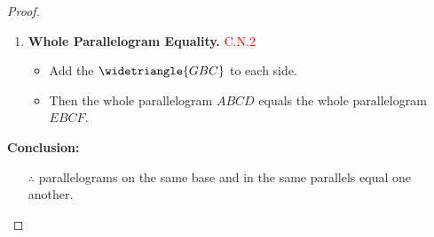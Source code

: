 \begin{proof}
\begin{enumerate}
    \item \textbf{Whole Parallelogram Equality. }\hfill\textcolor{red}{C.N.2}
    \begin{itemize}
        \item Add the $\widetriangle{GBC}$ to each side.
        \item Then the whole parallelogram $ABCD$ equals the whole parallelogram $EBCF$.
    \end{itemize}
\end{enumerate}

\clearpage

\textbf{Conclusion:}
\begin{itemize}
    \item[$\therefore$] parallelograms on the same base and in the same parallels equal one another.
\end{itemize}

\end{proof}

\clearpage
